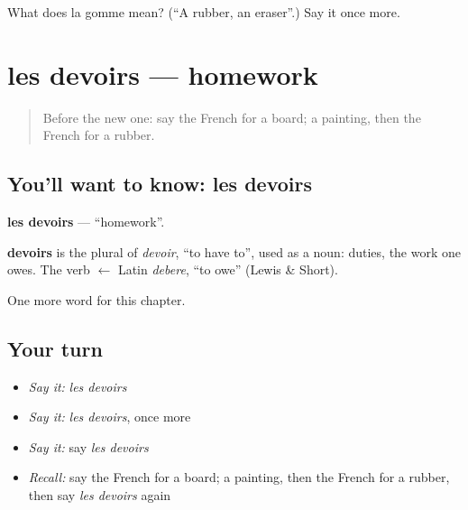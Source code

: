 \begin{tcolorbox}[breakable,colback=teal!4,colframe=teal!35!black,title={Before you move on}]
What does la gomme mean? (\textquotedblleft{}A rubber, an eraser\textquotedblright{}.) Say it once more.
\end{tcolorbox}
\section[les devoirs]{les devoirs — homework}

\label{lesson:FR-C127-devoirs}



\begin{quote}
Before the new one: say the French for a board; a painting, then the French for a rubber.
\end{quote}

\subsection*{You'll want to know: les devoirs}
\textbf{les devoirs} — \textquotedblleft{}homework\textquotedblright{}.

\begin{cousinweb}
\textbf{devoirs} is the plural of \emph{devoir}, \textquotedblleft{}to have to\textquotedblright{}, used as a noun: duties, the work one owes. The verb $\leftarrow$ Latin \emph{debere}, \textquotedblleft{}to owe\textquotedblright{} (Lewis \& Short).
\end{cousinweb}

\begin{grammarlens}[title={What you've built}]
One more word for this chapter.
\end{grammarlens}

\subsection*{Your turn}
\begin{itemize}
\raggedright
  \item \emph{Say it:} \emph{les devoirs}
  \item \emph{Say it:} \emph{les devoirs}, once more
  \item \emph{Say it:} say \emph{les devoirs}
  \item \emph{Recall:} say the French for a board; a painting, then the French for a rubber, then say \emph{les devoirs} again
\end{itemize}

